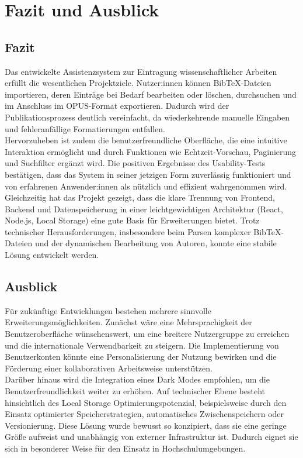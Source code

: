 \chapter{Fazit und Ausblick}

\section{Fazit}
Das entwickelte Assistenzsystem zur Eintragung wissenschaftlicher Arbeiten 
erfüllt die wesentlichen Projektziele. Nutzer:innen können BibTeX-Dateien 
importieren, deren Einträge bei Bedarf bearbeiten oder löschen, durchsuchen 
und im Anschluss im OPUS-Format exportieren. Dadurch wird der 
Publikationsprozess deutlich vereinfacht, da wiederkehrende manuelle 
Eingaben und fehleranfällige Formatierungen entfallen.\\

\noindent Hervorzuheben ist zudem die benutzerfreundliche Oberfläche, die eine intuitive 
Interaktion ermöglicht und durch Funktionen wie Echtzeit-Vorschau, Paginierung 
und Suchfilter ergänzt wird. Die positiven Ergebnisse des Usability-Tests 
bestätigen, dass das System in seiner jetzigen Form zuverlässig funktioniert 
und von erfahrenen Anwender:innen als nützlich und effizient wahrgenommen wird.\\

\noindent Gleichzeitig hat das Projekt gezeigt, dass die klare Trennung von Frontend, 
Backend und Datenspeicherung in einer leichtgewichtigen Architektur (React, 
Node.js, Local Storage) eine gute Basis für Erweiterungen bietet. Trotz 
technischer Herausforderungen, insbesondere beim Parsen komplexer 
BibTeX-Dateien und der dynamischen Bearbeitung von Autoren, konnte eine 
stabile Lösung entwickelt werden.

\section{Ausblick}
Für zukünftige Entwicklungen bestehen mehrere sinnvolle 
Erweiterungsmöglichkeiten. Zunächst wäre eine Mehrsprachigkeit der 
Benutzeroberfläche wünschenswert, um eine breitere Nutzergruppe zu erreichen 
und die internationale Verwendbarkeit zu steigern. Die Implementierung von 
Benutzerkonten könnte eine Personalisierung der Nutzung bewirken und die 
Förderung einer kollaborativen Arbeitsweise unterstützen.\\

\noindent Darüber hinaus wird die Integration eines Dark Modes empfohlen, um die 
Benutzerfreundlichkeit weiter zu erhöhen. Auf technischer Ebene besteht 
hinsichtlich des Local Storage Optimierungspotenzial, beispielsweise durch 
den Einsatz optimierter Speicherstrategien, automatisches Zwischenspeichern 
oder Versionierung. Diese Lösung wurde bewusst so konzipiert, dass sie eine 
geringe Größe aufweist und unabhängig von externer Infrastruktur ist. 
Dadurch eignet sie sich in besonderer Weise für den Einsatz in 
Hochschulumgebungen.\\

